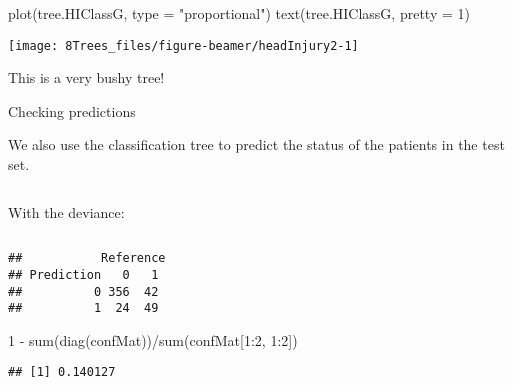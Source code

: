 \documentclass[
  10pt,
  ignorenonframetext,
]{beamer}
\newenvironment{Shaded}{\begin{snugshade}}{\end{snugshade}}
\newcommand{\AttributeTok}[1]{\textcolor[rgb]{0.77,0.63,0.00}{#1}}
\newcommand{\DecValTok}[1]{\textcolor[rgb]{0.00,0.00,0.81}{#1}}
\newcommand{\FunctionTok}[1]{\textcolor[rgb]{0.00,0.00,0.00}{#1}}
\newcommand{\NormalTok}[1]{#1}
\newcommand{\OtherTok}[1]{\textcolor[rgb]{0.56,0.35,0.01}{#1}}
\newcommand{\SpecialCharTok}[1]{\textcolor[rgb]{0.00,0.00,0.00}{#1}}
\newcommand{\StringTok}[1]{\textcolor[rgb]{0.31,0.60,0.02}{#1}}
\begin{document}
\begin{frame}[fragile]
\scriptsize

\begin{Shaded}
\begin{Highlighting}[]
\FunctionTok{plot}\NormalTok{(tree.HIClassG, }\AttributeTok{type =} \StringTok{"proportional"}\NormalTok{)}
\FunctionTok{text}\NormalTok{(tree.HIClassG, }\AttributeTok{pretty =} \DecValTok{1}\NormalTok{)}
\end{Highlighting}
\end{Shaded}

\begin{center}\texttt{[image: 8Trees\_files/figure-beamer/headInjury2-1]} \end{center}

\normalsize

This is a very bushy tree!
\end{frame}

\begin{frame}[fragile]
\begin{block}{Checking predictions}
\protect\hypertarget{checking-predictions}{}
\vspace{2mm}

We also use the classification tree to predict the status of the
patients in the test set.

\(~\)

With the deviance:

\(~\)

\tiny

\begin{Shaded}
\end{Shaded}

\begin{verbatim}
##           Reference
## Prediction   0   1
##          0 356  42
##          1  24  49
\end{verbatim}

\begin{Shaded}
\begin{Highlighting}[]
\DecValTok{1} \SpecialCharTok{{-}} \FunctionTok{sum}\NormalTok{(}\FunctionTok{diag}\NormalTok{(confMat))}\SpecialCharTok{/}\FunctionTok{sum}\NormalTok{(confMat[}\DecValTok{1}\SpecialCharTok{:}\DecValTok{2}\NormalTok{, }\DecValTok{1}\SpecialCharTok{:}\DecValTok{2}\NormalTok{])}
\end{Highlighting}
\end{Shaded}

\begin{verbatim}
## [1] 0.140127
\end{verbatim}
\end{block}
\end{frame}
\end{document}
